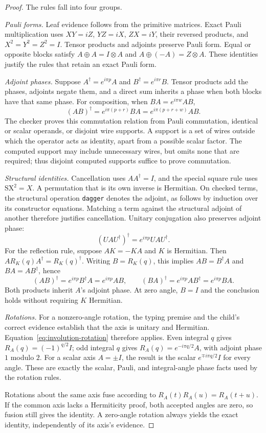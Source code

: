 \documentclass[11pt,a4paper]{article}
\newcommand{\code}[1]{\texttt{#1}}
\newcommand{\rot}[2]{R_{#1}(#2)}
\begin{document}
\begin{proof}
The rules fall into four groups.

\emph{Pauli forms.}
Leaf evidence follows from the primitive matrices. Exact Pauli
multiplication uses $XY=iZ$, $YZ=iX$, $ZX=iY$, their reversed
products, and $X^2=Y^2=Z^2=I$. Tensor products and adjoints preserve
Pauli form. Equal or opposite blocks satisfy
$A\oplus A=I\otimes A$ and $A\oplus(-A)=Z\otimes A$.
These identities justify the rules that retain an exact Pauli form.

\emph{Adjoint phases.}
Suppose $A^\dagger=e^{i\pi p}A$ and $B^\dagger=e^{i\pi r}B$.
Tensor products add the phases, adjoints negate them, and a direct
sum inherits a phase when both blocks have that same phase.
For composition, when $BA=e^{i\pi w}AB$,
\begin{equation}
  (AB)^\dagger=e^{i\pi(p+r)}BA
             =e^{i\pi(p+r+w)}AB.
  \label{eq:composition-phase}
\end{equation}
The checker proves this commutation relation from Pauli commutation,
identical or scalar operands, or disjoint wire supports. A support is a
set of wires outside which the operator acts as identity, apart from a
possible scalar factor. The computed support may include unnecessary
wires, but omits none that are required; thus disjoint computed supports
suffice to prove commutation.

\emph{Structural identities.}
Cancellation uses $AA^\dagger=I$, and the special square rule uses
$\mathrm{SX}^2=X$. A permutation that is its own inverse is Hermitian.
On checked terms, the structural operation \code{dagger} denotes the
adjoint, as follows by induction over its constructor equations. Matching
a term against the structural adjoint of another therefore justifies
cancellation. Unitary conjugation also preserves adjoint phase:
\[
  (UAU^\dagger)^\dagger=e^{i\pi p}UAU^\dagger.
\]
For the reflection rule, suppose $AK=-KA$ and $K$ is Hermitian. Then
$A\rot Kq A^\dagger=\rot Kq^\dagger$. Writing $B=\rot Kq$, this implies
$AB=B^\dagger A$ and $BA=AB^\dagger$, hence
\[
  (AB)^\dagger=e^{i\pi p}B^\dagger A=e^{i\pi p}AB,
  \qquad
  (BA)^\dagger=e^{i\pi p}AB^\dagger=e^{i\pi p}BA.
\]
Both products inherit $A$'s adjoint phase. At zero angle, $B=I$ and
the conclusion holds without requiring $K$ Hermitian.

\emph{Rotations.}
For a nonzero-angle rotation, the typing premise and the child's
correct evidence establish that the axis is unitary and Hermitian.
Equation~\eqref{eq:involution-rotation} therefore applies.
Even integral $q$ gives $\rot Aq=(-1)^{q/2}I$; odd integral $q$ gives
$\rot Aq=e^{-i\pi q/2}A$, with adjoint phase $1$ modulo $2$.
For a scalar axis $A=\pm I$, the result is the scalar
$e^{\mp i\pi q/2}I$ for every angle. These are exactly the scalar,
Pauli, and integral-angle phase facts used by the rotation rules.

Rotations about the same axis fuse according to
$\rot At\rot Au=\rot A{t+u}$. If the common axis lacks a
Hermiticity proof, both accepted angles are zero, so fusion still
gives the identity. A zero-angle rotation always yields the exact
identity, independently of its axis's evidence.
\end{proof}
\end{document}
